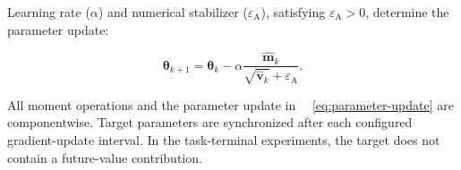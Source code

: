\documentclass[journal]{IEEEtran}
\providecommand*{\algorithmautorefname}{Algorithm}
\providecommand*{\figureautorefname}{Figure}
\providecommand*{\subfigureautorefname}{Figure}
\providecommand*{\Autoref}[1]{%
  \begingroup
  \def\sectionautorefname{Section}%
  \def\subsectionautorefname{Subsection}%
  \def\subsubsectionautorefname{Subsubsection}%
  \def\algorithmautorefname{Algorithm}%
  \def\figureautorefname{Figure}%
  \def\subfigureautorefname{Figure}%
 ~\autoref{#1}%
  \endgroup
}
\newcommand{\Autoref}[1]{Eq.~\Autoref{#1}}
\begin{document}
Learning rate (\(\alpha\)) and numerical stabilizer (\(\varepsilon_{\mathrm A}\)), satisfying \(\varepsilon_{\mathrm A}>0\), determine the parameter update:

\begin{equation}
\label{eq:parameter-update}
\boldsymbol\theta_{k+1}
=
\boldsymbol\theta_k
-
\alpha
\frac{
\widehat{\mathbf m}_k
}{
\sqrt{\widehat{\mathbf v}_k}
+\varepsilon_{\mathrm A}
}.
\end{equation}

All moment operations and the parameter update in~\Autoref{eq:parameter-update} are componentwise. Target parameters are synchronized after each configured gradient-update interval. In the task-terminal experiments, the target does not contain a future-value contribution.

\end{document}
